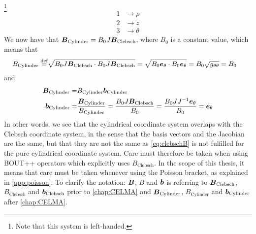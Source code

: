 %
\footnote{
    Note that this system is left-handed.
}
%
\begin{align*}
    1 &\to \rho\\
    2 &\to z\\
    3 &\to \theta
\end{align*}
%
We now have that $\boldsymbol{B}_{\text{Cylinder}}=B_0J\boldsymbol{B}_{\text{Clebsch}}$, where $B_0$ is a constant value, which means that
%
\begin{align*}
    B_{\text{Cylinder}}\overset{\text{def}}{=} &
    \sqrt{B_0J\boldsymbol{B}_{\text{Clebsch}}\cdot B_0J\boldsymbol{B}_{\text{Clebsch}}}
    = \sqrt{B_0\boldsymbol{e}_\theta\cdot B_0\boldsymbol{e}_\theta}
    = B_0\sqrt{g_{\theta\theta}}
    = B_0
\end{align*}
%
and
%
\begin{align*}
    \boldsymbol{B}_{\text{Cylinder}}=&B_{\text{Cylinder}}\boldsymbol{b}_{\text{Cylinder}}\\
    \boldsymbol{b}_{\text{Cylinder}}
    =&\frac{\boldsymbol{B}_{\text{Cylinder}}}{B_{\text{Cylinder}}}
    =\frac{B_0J\boldsymbol{B}_{\text{Clebsch}}}{B_0}
    =\frac{B_0JJ^{-1}\boldsymbol{e}_\theta}{B_0}
    =\boldsymbol{e}_\theta
\end{align*}
%
In other words, we see that the cylindrical coordinate system overlaps with the Clebsch coordinate system, in the sense that the basis vectors and the Jacobian are the same, but that they are not the same as \cref{eq:clebschB} is not fulfilled for the pure cylindrical coordinate system.
Care must therefore be taken when using BOUT++ operators which explicitly uses ${B}_{\text{Clebsch}}$.
In the scope of this thesis, it means that care must be taken whenever using the Poisson bracket, as explained in \cref{app:poisson}.
To clarify the notation: $\boldsymbol{B}$, $B$ and $\boldsymbol{b}$ is referring to $\boldsymbol{B}_{\text{Clebsch}}$, $B_{\text{Clebsch}}$ and $\boldsymbol{b}_{\text{Clebsch}}$ prior to \cref{chap:CELMA} and $\boldsymbol{B}_{\text{Cylinder}}$, $B_{\text{Cylinder}}$ and $\boldsymbol{b}_{\text{Cylinder}}$ after \cref{chap:CELMA}.
